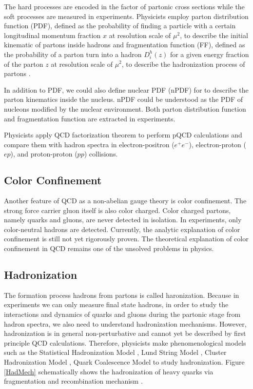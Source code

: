 The hard processes are encoded in the factor of partonic cross sections while the soft processes are measured in experiments. Physicists employ parton distribution function (PDF), defined as the probability of finding a particle with a certain longitudinal momentum fraction $x$ at resolution scale of $\mu^2$, to describe the initial kinematic of partons inside hadrons \cite{PDFRef} and fragmentation function (FF), defined as the probability of a parton turn into a hadron $D_i^h(z)$ for a given energy fraction of the parton $z$ at resolution scale of $\mu^2$, to describe the hadronization process of partons \cite{QCDFFunc}. 

In addition to PDF, we could also define nuclear PDF (nPDF) for \cite{nPDFDef} to describe the parton kinematics inside the nucleus. nPDF could be understood as the PDF of nucleons modified by the nuclear environment. Both parton distribution function and fragmentation function are extracted in experiments.

Physicists apply QCD factorization theorem to perform pQCD calculations and compare them with hadron spectra in electron-positron ($e^+e^-$), electron-proton ($ep$), and proton-proton ($pp$) collisions.

\subsection{Color Confinement}

Another feature of QCD as a non-abelian gauge theory is color confinement. The strong force carrier gluon itself is also color charged. Color charged partons, namely quarks and gluons, are never detected in isolation. In experiments, only color-neutral hadrons are detected. Currently, the analytic explanation of color confinement is still not yet rigorously proven. The theoretical explanation of color confinement in QCD remains one of the unsolved problems in physics. 

\subsection{Hadronization}

The formation process hadrons from partons is called haronization. Because in experiments we can only measure final state hadrons, in order to study the interactions and dynamics of quarks and gluons during the partonic stage from hadron spectra, we also need to understand hadronization mechanisms. However, hadronization is in general non-perturbative and cannot yet be described by first principle QCD calculations. Therefore, physicists make phenomenological models such as the Statistical Hadronization Model \cite{SHM}, Lund String Model \cite{LSM}, Cluster Hadronization Model \cite{CHM}, Quark Coalescence Model \cite{QCM} to study hadronization. Figure \ref{HadMech} schematically shows the hadronization of heavy quarks via fragmentation \cite{JetFrag} and recombination mechanism \cite{QuarkCoal}.

